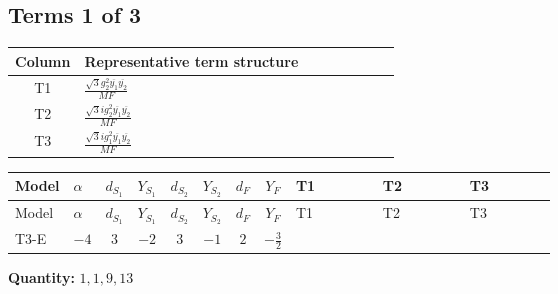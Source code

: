 \documentclass[8pt]{article}
\begin{document}
\begin{landscape}
\subsection*{Terms 1 of 3}
\begin{center}
\begin{tabular}{@{}c >{\raggedright\arraybackslash}p{0.82\linewidth}@{}}
\toprule
Column & Representative term structure \\
\midrule
T1 & \(\displaystyle \frac{\sqrt{3} g_{2}^{2} \overline{y_{1}} \overline{y_{2}}}{MF}\) \\
\midrule
T2 & \(\displaystyle \frac{\sqrt{3} i g_{2}^{2} \overline{y_{1}} \overline{y_{2}}}{MF}\) \\
\midrule
T3 & \(\displaystyle \frac{\sqrt{3} i g_{1}^{2} \overline{y_{1}} \overline{y_{2}}}{MF}\) \\
\midrule
\bottomrule
\end{tabular}
\end{center}
\smallskip
\tiny
\begin{longtable}{@{}llcccccc >{\raggedright\arraybackslash}p{0.21\linewidth} >{\raggedright\arraybackslash}p{0.21\linewidth} >{\raggedright\arraybackslash}p{0.21\linewidth}@{}}
\toprule
Model & $\alpha$ & $d_{S_1}$ & $Y_{S_1}$ & $d_{S_2}$ & $Y_{S_2}$ & $d_F$ & $Y_F$ & T1 & T2 & T3 \\
\midrule
\endfirsthead
\toprule
Model & $\alpha$ & $d_{S_1}$ & $Y_{S_1}$ & $d_{S_2}$ & $Y_{S_2}$ & $d_F$ & $Y_F$ & T1 & T2 & T3 \\
\midrule
\endhead
T3-E & $-4$ & $3$ & $-2$ & $3$ & $-1$ & $2$ & $-\frac{3}{2}$ & \scriptsize\adjustbox{max width=\linewidth}{$\begin{gathered} - \frac{\sqrt{3} g_{2}^{2} \overline{y_{1}} \overline{y_{2}}}{6 MF}\end{gathered}$} & \scriptsize\adjustbox{max width=\linewidth}{$\begin{gathered} - \frac{49 \sqrt{3} i g_{2}^{2} \overline{y_{1}} \overline{y_{2}}}{24 MF}\end{gathered}$} & \scriptsize\adjustbox{max width=\linewidth}{$\begin{gathered} - \frac{9 \sqrt{3} i g_{1}^{2} \overline{y_{1}} \overline{y_{2}}}{8 MF}\end{gathered}$} \\
\midrule
\bottomrule
\end{longtable}
\clearpage
\noindent\textbf{Quantity: }$\mathrm{1,1,9,13}$\par\smallskip

\end{landscape}
\end{document}
